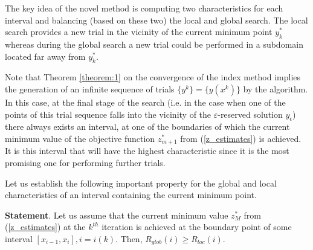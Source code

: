 \documentclass[twocolumn]{svjour3}          %
\begin{document}
	The key idea of the novel method is computing two characteristics for each interval and balancing (based on these two) the local and global search. The local search provides a new trial in the vicinity of the current minimum point $y_k^\ast$  whereas during the global search a new trial could be performed in a subdomain located far away from $y_k^\ast$. 
	
	Note that Theorem \ref{theorem:1} on the convergence of the index method implies the generation of an infinite sequence of trials $\{y^k\}=\big\{y(x^k )\big\}$ by the algorithm. In this case, at the final stage of the search (i.e. in the case when one of the points of this trial sequence falls into the vicinity of the $\varepsilon$-reserved solution $y_\epsilon$) there always exists an interval, at one of the boundaries of which the current minimum value of the objective function $z_{m+1}^\ast$  from (\ref{z_estimates}) is achieved. It is this interval that will have the highest characteristic since it is the most promising one for performing further trials. 

	Let us establish the following important property for the global and local characteristics of an interval containing the current minimum point.

	\textbf{Statement}. Let us assume that the current minimum value $z_M^\ast$  from (\ref{z_estimates}) at the $k^{th}$ iteration is achieved at the boundary point of some interval $[x_{i-1}, x_i], i=i(k)$. Then, $R_{glob}(i) \geq R_{loc}(i)$.
\end{document}
